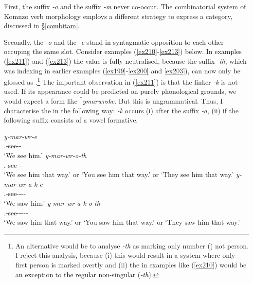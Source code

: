 First, the  suffix \emph{-a} and the  suffix \emph{-m} never co-occur. The combinatorial system of Komnzo verb morphology employs a different strategy to express a   category, discussed in \S{}\ref{combitam}.%

Secondly, the  \emph{-o} and the \Fnsg{} \emph{-e} stand in syntagmatic opposition to each other occuping the same slot. Consider examples (\ref{ex210}-\ref{ex213}) below. In examples (\ref{ex211}) and (\ref{ex213}) the  value is fully neutralised, because the suffix \emph{-th}, which was indexing \Stnsg{} in earlier examples (\ref{ex199}-\ref{ex200} and \ref{ex203}), can now only be glossed as \Nsg{}.\footnote{An alternative would be to analyse \emph{-th} as marking only number (\Nsg) not person. I reject this analysis, because (i) this would result in a system where only first person is marked overtly and (ii) the \Fnsg{} in examples like (\ref{ex210}) would be an exception to the regular non-singular (\emph{-th}).} The important observation in (\ref{ex211}) is that the linker \emph{-k} is not used. If its appearance could be predicted on purely phonological grounds, we would expect a form like \textsuperscript{$\ast$}\emph{ymarwroke}. But this is ungrammatical. Thus, I characterise the  in the following way: \emph{-k} occurs (i) after the  suffix \emph{-a}, (ii) if the following suffix consists of a vowel formative.

\begin{exe}
\ex
\begin{xlist}
	\ex
	\gll \emph{y-mar-wr-e}\\
	\Tsg.\Masc-see-\Ndu-\Fnsg\\
	\trans `We see him.'
	\label{ex210}
	\ex
	\gll \emph{y-mar-wr-o-th}\\
	\Tsg.\Masc-see-\Ndu-\Andat-\Nsg\\
	\trans `We see him that way.' or `You see him that way.' or `They see him that way.'
	\label{ex211}
	\ex
	\gll \emph{y-mar-wr-a-k-e}\\
	\Tsg.\Masc-see-\Ndu-\Pst-\Lk-\Fnsg\\
	\trans `We saw him.'
	\label{ex212}
	\ex
	\gll \emph{y-mar-wr-a-k-o-th}\\
	\Tsg.\Masc-see-\Ndu-\Pst-\Lk-\Andat-\Nsg\\
	\trans `We saw him that way.' or `You saw him that way.' or `They saw him that way.'
	\label{ex213}
\end{xlist}
\end{exe}

